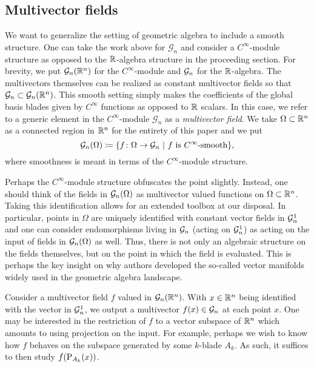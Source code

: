 

\subsection{Multivector fields}

We want to generalize the setting of geometric algebra to include a smooth structure. One can take the work above for $\mathcal{G}_n$ and consider a $C^{\infty}$-module structure as opposed to the $\mathbb{R}$-algebra structure in the proceeding section. For brevity, we put $\mathcal{G}_n(\mathbb{R}^n)$ for the $C^\infty$-module and $\mathcal{G}_n$ for the $\mathbb{R}$-algebra. The multivectors themselves can be realized as constant multivector fields so that $\mathcal{G}_n \subset \mathcal{G}_n(\mathbb{R}^n)$. This smooth setting simply makes the coefficients of the global basis blades given by $C^\infty$ functions as opposed to $\mathbb{R}$ scalars.  In this case, we refer to a generic element in the $C^{\infty}$-module $\mathcal{G}_n$ as a \emph{multivector field}. We take $\Omega \subset \mathbb{R}^n$ as a connected region in $\mathbb{R}^n$ for the entirety of this paper and we put
\[
\mathcal{G}_n(\Omega) \coloneqq \{ f \colon \Omega \to \mathcal{G}_n ~\vert~ \textrm{$f$ is $C^\infty$-smooth}\},
\]
where smoothness is meant in terms of the $C^\infty$-module structure.

Perhaps the $C^\infty$-module structure obfuscates the point slightly.  Instead, one should think of the fields in $\mathcal{G}_n(\Omega)$ as multivector valued functions on $\Omega \subset \mathbb{R}^n$.  Taking this identification allows for an extended toolbox at our disposal.  In particular, points in $\Omega$ are uniquely identified with constant vector fields in $\mathcal{G}_n^1$ and one can consider endomorphisms living in $\mathcal{G}_n$ (acting on $\mathcal{G}_n^1$) as acting on the input of fields in $\mathcal{G}_n(\Omega)$ as well.  Thus, there is not only an algebraic structure on the fields themselves, but on the point in which the field is evaluated.  This is perhaps the key insight on why authors developed the so-called vector manifolds widely used in the geometric algebra landscape.

\begin{example}
    Consider a multivector field $f$ valued in $\mathcal{G}_n(\mathbb{R}^n)$.  With $x\in \mathbb{R}^n$ being identified with the vector in $\mathcal{G}_n^1$, we output a multivector $f(x) \in \mathcal{G}_n$ at each point $x$.  One may be interested in the restriction of $f$ to a vector subspace of $\mathbb{R}^n$ which amounts to using projection on the input.  For example, perhaps we wish to know how $f$ behaves on the subspace generated by some $k$-blade $A_k$.  As such, it suffices to then study $f(\operatorname{P}_{A_k}(x))$.  
\end{example}

